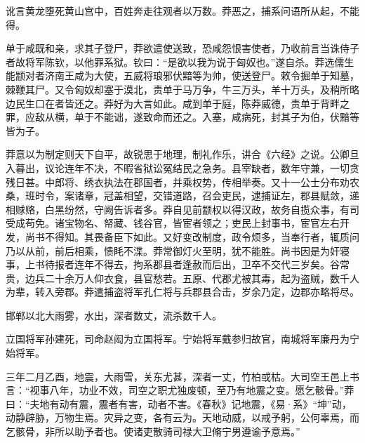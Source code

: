 \documentclass[12pt,UTF8]{ctexbook}
\begin{document}
讹言黄龙堕死黄山宫中，百姓奔走往观者以万数。莽恶之，捕系问语所从起，不能得。



单于咸既和亲，求其子登尸，莽欲遣使送致，恐咸怨恨害使者，乃收前言当诛侍子者故将军陈钦，以他罪系狱。钦曰：“是欲以我为说于匈奴也。”遂自杀。莽选儒生能颛对者济南王咸为大使，五威将琅邪伏黯等为帅，使送登尸。敕令掘单于知墓，棘鞭其尸。又令匈奴却塞于漠北，责单于马万争，牛三万头，羊十万头，及稍所略边民生口在者皆还之。莽好为大言如此。咸到单于庭，陈莽威德，责单于背畔之罪，应敌从横，单于不能诎，遂致命而还之。入塞，咸病死，封其子为伯，伏黯等皆为子。



莽意以为制定则天下自平，故锐思于地理，制礼作乐，讲合《六经》之说。公卿旦入暮出，议论连年不决，不暇省狱讼冤结民之急务。县宰缺者，数年守兼，一切贪残日甚。中郎将、绣衣执法在郡国者，并乘权势，传相举奏。又十一公士分布劝农桑，班时令，案诸章，冠盖相望，交错道路，召会吏民，逮捕证左，郡县赋敛，递相赇赂，白黑纷然，守阙告诉者多。莽自见前颛权以得汉政，故务自揽众事，有司受成苟免。诸宝物名、帑藏、钱谷官，皆宦者领之；吏民上封事书，宦官左右开发，尚书不得知。其畏备臣下如此。又好变改制度，政令烦多，当奉行者，辄质问乃以从前，前后相乘，愦眊不渫。莽常御灯火至明，犹不能胜。尚书因是为奸寝事，上书待报者连年不得去，拘系郡县者逢赦而后出，卫卒不交代三岁矣。谷常贵，边兵二十余万人仰衣食，县官愁若。五原、代郡尤被其毒，起为盗贼，数千人为辈，转入旁郡。莽遣捕盗将军孔仁将与兵郡县合击，岁余乃定，边郡亦略将尽。



邯郸以北大雨雾，水出，深者数丈，流杀数千人。



立国将军孙建死，司命赵闳为立国将军。宁始将军戴参归故官，南城将军廉丹为宁始将军。



三年二月乙酉，地震，大雨雪，关东尤甚，深者一丈，竹柏或枯。大司空王邑上书言：“视事八年，功业不效，司空之职尤独废顿，至乃有地震之变。愿乞骸骨。”莽曰：“夫地有动有震，震者有害，动者不害。《春秋》记地震，《易·系》“坤”动，动静辟胁，万物生焉。灾异之变，各有云为。天地动威，以戒予躬，公何辜焉，而乞骸骨，非所以助予者也。使诸吏散骑司禄大卫脩宁男遵谕予意焉。”
\end{document}
